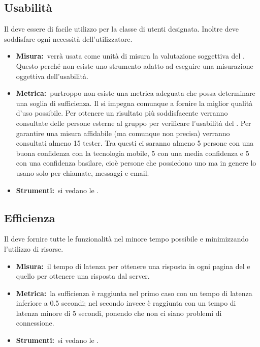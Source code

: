 	\subsection{Usabilità}
	\label{usabilita}
		Il  deve essere di facile utilizzo per la classe di utenti designata. Inoltre deve soddisfare ogni necessità dell'utilizzatore.
		\begin{itemize}
			\item \textbf{Misura:}\ verrà usata come unità di misura la valutazione soggettiva del . Questo perché non esiste uno strumento adatto ad eseguire una misurazione oggettiva dell'usabilità.
			\item \textbf{Metrica:}\ purtroppo non esiste una metrica adeguata che possa determinare una soglia di sufficienza. Il  si impegna comunque a fornire la miglior qualità d'uso possibile. Per ottenere un risultato più soddisfacente verranno consultate delle persone esterne al gruppo per verificare l'usabilità del . Per garantire una misura affidabile (ma comunque non precisa) verranno consultati almeno 15 tester. Tra questi ci saranno almeno 5 persone con una buona confidenza con la tecnologia mobile, 5 con una media confidenza e 5 con una confidenza basilare, cioè persone che possiedono uno  ma in genere lo usano solo per chiamate, messaggi e email.
			\item \textbf{Strumenti:}\ si vedano le \NPdoc.
		\end{itemize}
	\subsection{Efficienza}
	\label{efficienza}
		Il  deve fornire tutte le funzionalità nel minore tempo possibile e minimizzando l'utilizzo di risorse.
		\begin{itemize}
			\item \textbf{Misura:}\ il tempo di latenza per ottenere una risposta in ogni pagina del  e quello per ottenere una risposta dal server.
			\item \textbf{Metrica:}\ la sufficienza è raggiunta nel primo caso con un tempo di latenza inferiore a 0.5 secondi; nel secondo invece è raggiunta con un tempo di latenza minore di 5 secondi, ponendo che non ci siano problemi di connessione.
			\item \textbf{Strumenti:}\ si vedano le \NPdoc.
		\end{itemize}
